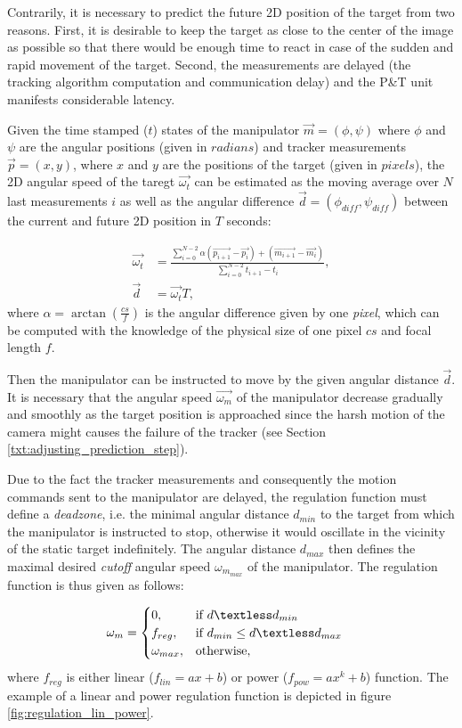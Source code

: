 Contrarily, it is necessary to predict the future 2D position of the target from two reasons. First, it is desirable to keep the target as close to the center of the image as possible so that there would be enough time to react in case of the sudden and rapid movement of the target. Second, the measurements are delayed (the tracking algorithm computation and communication delay) and the P\&T unit manifests considerable latency.

Given the time stamped ($t$) states of the manipulator $\vec{m} = (\phi, \psi)$ where $\phi$ and $\psi$ are the angular positions (given in $radians$) and tracker measurements $\vec{p} = (x, y)$, where $x$ and $y$ are the positions of the target (given in $pixels$), the 2D angular speed of the taregt $\vec{\omega_{t}}$ can be estimated as the moving average over $N$ last measurements $i$ as well as the angular difference $\vec{d} = (\phi_{diff}, \psi_{diff})$ between the current and future 2D position in $T$ seconds:

\begin{align}
	\vec{\omega_{t}} &= \frac{\sum_{i=0}^{N-2}{\alpha(\vec{p_{i+1}} - \vec{p_{i}}) + (\vec{m_{i+1}} - \vec{m_{i}})}}{\sum_{i=0}^{N-2}{t_{i+1} - t_{i}}},\\
	\vec{d} &= \vec{\omega_{t}}T,
\end{align}
where $\alpha = \arctan{(\frac{cs}{f})}$ is the angular difference given by one \textit{pixel}, which can be computed with the knowledge of the physical size of one pixel $cs$ and focal length $f$.

Then the manipulator can be instructed to move by the given angular distance $\vec{d}$. It is necessary that the angular speed $\vec{\omega_{m}}$ of the manipulator decrease gradually and smoothly as the target position is approached since the harsh motion of the camera might causes the failure of the tracker (see Section \ref{txt:adjusting_prediction_step}).

Due to the fact the tracker measurements and consequently the motion commands sent to the manipulator are delayed, the regulation function must define a \textit{deadzone}, i.e. the minimal angular distance $d_{min}$ to the target from which the manipulator is instructed to stop, otherwise it would oscillate in the vicinity of the static target indefinitely. The angular distance $d_{max}$ then defines the maximal desired \textit{cutoff} angular speed $\omega_{m_{max}}$ of the manipulator. The regulation function is thus given as follows:

\begin{align}
	\omega_{m} &=
	\begin{cases}
		0,  & \text{if}\ d \textless d_{min}\\
		f_{reg},  & \text{if}\ d_{min} \leq d \textless d_{max}\\
		\omega_{max}, & \text{otherwise},
	\end{cases}
\end{align}
where $f_{reg}$ is either linear ($f_{lin} = ax+b$) or power ($f_{pow} = ax^{k}+b$) function. The example of a linear and power regulation function is depicted in figure \ref{fig:regulation_lin_power}.

